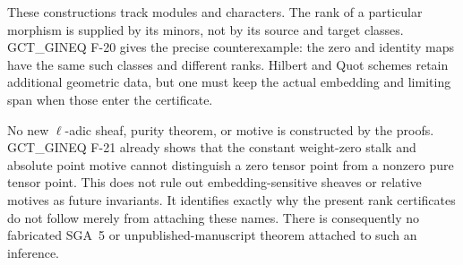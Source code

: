These constructions track modules and characters.
The rank of a particular morphism is supplied by
its minors, not by its source and target classes.
GCT\_GINEQ F-20 gives the precise counterexample:
the zero and identity maps have the same such
classes and different ranks. Hilbert and Quot
schemes retain additional geometric data, but
one must keep the actual embedding and limiting
span when those enter the certificate.

No new $\ell$-adic sheaf, purity theorem, or motive
is constructed by the proofs. GCT\_GINEQ F-21
already shows that the constant weight-zero stalk
and absolute point motive cannot distinguish a
zero tensor point from a nonzero pure tensor point.
This does not rule out embedding-sensitive sheaves
or relative motives as future invariants. It
identifies exactly why the present rank certificates
do not follow merely from attaching these names.
There is consequently no fabricated SGA~5 or
unpublished-manuscript theorem attached to such an
inference.
